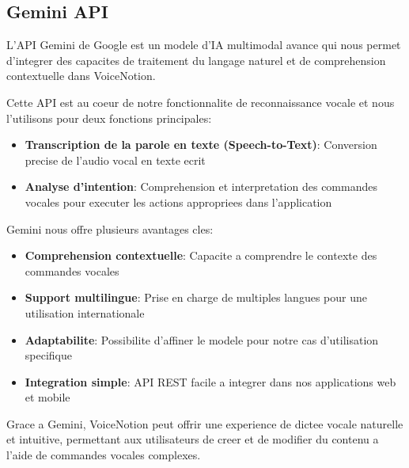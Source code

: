 \subsection{Gemini API}
\begin{minipage}{0.7\textwidth}
L'API Gemini de Google est un modele d'IA multimodal avance qui nous permet d'integrer des capacites de traitement du langage naturel et de comprehension contextuelle dans VoiceNotion. 

Cette API est au coeur de notre fonctionnalite de reconnaissance vocale et nous l'utilisons pour deux fonctions principales:
\begin{itemize}
    \item \textbf{Transcription de la parole en texte (Speech-to-Text)}: Conversion precise de l'audio vocal en texte ecrit
    \item \textbf{Analyse d'intention}: Comprehension et interpretation des commandes vocales pour executer les actions appropriees dans l'application
\end{itemize}

Gemini nous offre plusieurs avantages cles:
\begin{itemize}
    \item \textbf{Comprehension contextuelle}: Capacite a comprendre le contexte des commandes vocales
    \item \textbf{Support multilingue}: Prise en charge de multiples langues pour une utilisation internationale
    \item \textbf{Adaptabilite}: Possibilite d'affiner le modele pour notre cas d'utilisation specifique
    \item \textbf{Integration simple}: API REST facile a integrer dans nos applications web et mobile
\end{itemize}

Grace a Gemini, VoiceNotion peut offrir une experience de dictee vocale naturelle et intuitive, permettant aux utilisateurs de creer et de modifier du contenu a l'aide de commandes vocales complexes.
\end{minipage}%
\hfill
